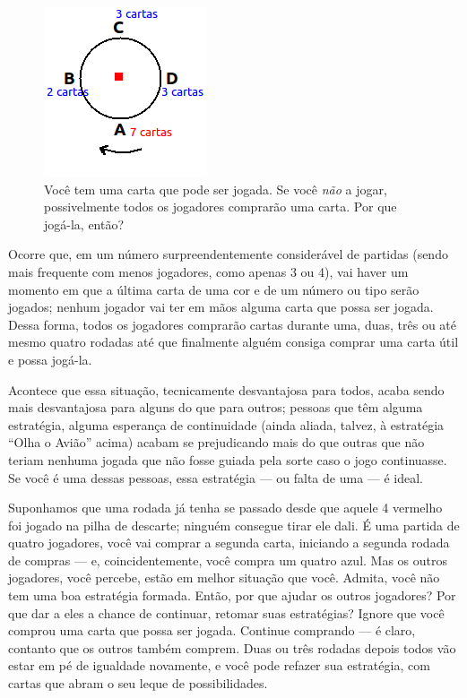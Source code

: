 \begin{figure}
  \begin{center}
    \includegraphics[scale=0.6]{fig4.png}
  \end{center}
  \caption{Você tem uma carta que pode ser jogada. Se você \emph{não} a jogar, possivelmente todos os jogadores comprarão uma carta. Por que jogá-la, então?}
\end{figure}

Ocorre que, em um número surpreendentemente considerável de partidas (sendo mais frequente com menos jogadores, como apenas 3 ou 4), vai haver um momento em que a última carta de uma cor e de um número ou tipo serão jogados; nenhum jogador vai ter em mãos alguma carta que possa ser jogada. Dessa forma, todos os jogadores comprarão cartas durante uma, duas, três ou até mesmo quatro rodadas até que finalmente alguém consiga comprar uma carta útil e possa jogá-la.

Acontece que essa situação, tecnicamente desvantajosa para todos, acaba sendo mais desvantajosa para alguns do que para outros; pessoas que têm alguma estratégia, alguma esperança de continuidade (ainda aliada, talvez, à estratégia ``Olha o Avião'' acima) acabam se prejudicando mais do que outras que não teriam nenhuma jogada que não fosse guiada pela sorte caso o jogo continuasse. Se você é uma dessas pessoas, essa estratégia --- ou falta de uma --- é ideal.

Suponhamos que uma rodada já tenha se passado desde que aquele 4 vermelho foi jogado na pilha de descarte; ninguém consegue tirar ele dali. É uma partida de quatro jogadores, você vai comprar a segunda carta, iniciando a segunda rodada de compras --- e, coincidentemente, você compra um quatro azul. Mas os outros jogadores, você percebe, estão em melhor situação que você. Admita, você não tem uma boa estratégia formada. Então, por que ajudar os outros jogadores? Por que dar a eles a chance de continuar, retomar suas estratégias? Ignore que você comprou uma carta que possa ser jogada. Continue comprando --- é claro, contanto que os outros também comprem. Duas ou três rodadas depois todos vão estar em pé de igualdade novamente, e você pode refazer sua estratégia, com cartas que abram o seu leque de possibilidades.

